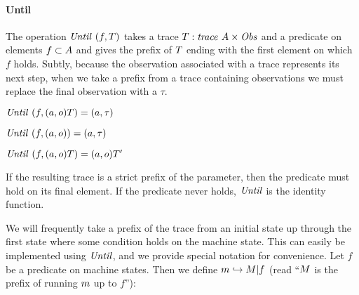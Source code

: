 \documentclass[acmsmall,review,anonymous]{acmart}\settopmatter{printfolios=true,printccs=false,printacmref=false}
\begin{document}
\paragraph*{Until}
The operation \(\mathit{Until}~(f,T)\)
takes a trace
\(T : \mathit{trace} ~ A \times \mathit{Obs}\) and a predicate
on elements \(f \subset A\) and gives the prefix of
\(T\) ending with the first element on which \(f\) holds.
Subtly, because the observation associated with a trace represents its
next step, when we take a prefix from a trace containing observations
we must replace the final observation with a \(\tau\).

  \begin{center}
  \begin{minipage}{.3\textwidth}
             {\(\mathit{Until}~(f,(a,o)T) = (a,\tau)\)}
  \end{minipage}
%
  \begin{minipage}{.3\textwidth}
  \judgment{}
           {\(\mathit{Until}~(f,(a,o)) = (a,\tau)\)}
%
  \end{minipage}
  \begin{minipage}{.3\textwidth}
              {\(\mathit{Until}~(f,(a,o)T) = (a,o)T'\)}
  \end{minipage}
  \end{center}
%
If the resulting trace is a strict prefix of the parameter, then the
predicate must hold on its final element. If the predicate never holds,
\(\mathit{Until}\) is the identity function.



We will frequently take a prefix of the trace from an initial state up
through the first state where some condition holds on the machine state.
This can easily be implemented using \(\mathit{Until}\), and we provide special notation
for convenience.
%
Let \(f\) be a predicate on machine states. Then we define \(m
\hookrightarrow M | f\) (read ``\(M\) is the prefix of
running \(m\) up to \(f\)''):
\end{document}
